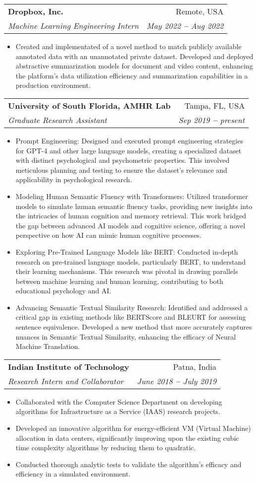 \documentclass[letterpaper,11pt]{article}
\makeatletter
\newcommand{\resumeItem}[1]{
  \item\small{
    {#1 \vspace{-2pt}}
  }
}
\newcommand{\resumeSubheading}[4]{
  \vspace{-2pt}\item
    \begin{tabular*}{0.97\textwidth}[t]{l@{\extracolsep{\fill}}r}
      \textbf{#1} & #2 \\
      \textit{\small#3} & \textit{\small #4} \\
    \end{tabular*}\vspace{-7pt}
}
\newcommand{\resumeItemListStart}{\begin{itemize}}
\newcommand{\resumeItemListEnd}{\end{itemize}\vspace{-5pt}}
\makeatother
\begin{document}
\resumeSubheading
{Dropbox, Inc.}{Remote, USA}
{Machine Learning Engineering Intern}{May 2022 \textbf{--} Aug 2022}
\resumeItemListStart
\resumeItem{Created and implementated of a novel method to match publicly available annotated data with an unannotated private dataset. Developed and deployed abstractive summarization models for document and video content, enhancing the platform's data utilization efficiency and summarization capabilities in a production environment.}
\resumeItemListEnd

\resumeSubheading
{University of South Florida, AMHR Lab}{Tampa, FL, USA}
{Graduate Research Assistant}{Sep 2019 \textbf{--} present}
\resumeItemListStart
\resumeItem{Prompt Engineering: Designed and executed prompt engineering strategies for GPT-4 and other large language models, creating a specialized dataset with distinct psychological and psychometric properties. This involved meticulous planning and testing to ensure the dataset's relevance and applicability in psychological research.}
\resumeItem{Modeling Human Semantic Fluency with Transformers: Utilized transformer models to simulate human semantic fluency tasks, providing new insights into the intricacies of human cognition and memory retrieval. This work bridged the gap between advanced AI models and cognitive science, offering a novel perspective on how AI can mimic human cognitive processes.}
\resumeItem{Exploring Pre-Trained Language Models like BERT: Conducted in-depth research on pre-trained language models, particularly BERT, to understand their learning mechanisms. This research was pivotal in drawing parallels between machine learning and human learning, contributing to both educational psychology and AI.}
\resumeItem{Advancing Semantic Textual Similarity Research: Identified and addressed a critical gap in existing methods like BERTScore and BLEURT for assessing sentence equivalence. Developed a new method that more accurately captures nuances in Semantic Textual Similarity, enhancing the efficacy of Neural Machine Translation.}
\resumeItemListEnd

\resumeSubheading
{Indian Institute of Technology}{Patna, India}
{Research Intern and Collaborator}{June 2018 \textbf{--} July 2019}
\resumeItemListStart
\resumeItem{Collaborated with the Computer Science Department on developing algorithms for Infrastructure as a Service (IAAS) research projects.}
\resumeItem{Developed an innovative algorithm for energy-efficient VM (Virtual Machine) allocation in data centers, significantly improving upon the existing cubic time complexity algorithms by reducing them to quadratic.}
\resumeItem{Conducted thorough analytic tests to validate the algorithm's efficacy and efficiency in a simulated environment.}
\resumeItemListEnd
\end{document}
